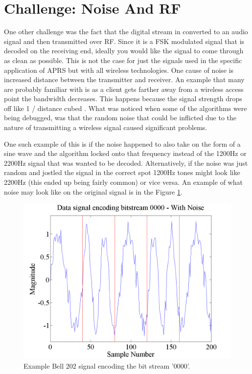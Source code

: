 \section{Challenge: Noise And RF}
One other challenge was the fact that the digital stream in converted to an audio signal and then transmitted over RF. Since it is a FSK modulated signal that is decoded on the receiving end, ideally you would like the signal to come through as clean as possible. This is not the case for just the signals used in the specific application of APRS but with all wireless technologies. One cause of noise is increased distance between the transmitter and receiver. An example that many are probably familiar with is as a client gets farther away from a wireless access point the bandwidth decreases. This happens because the signal strength drops off like 1 / distance cubed \cite{4Gon}. What was noticed when some of the algorithms were being debugged, was that the random noise that could be inflicted due to the nature of transmitting a wireless signal caused significant problems.

One such example of this is if the noise happened to also take on the form of a sine wave and the algorithm locked onto that frequency instead of the 1200Hz or 2200Hz signal that was wanted to be decoded. Alternatively, if the noise was just random and jostled the signal in the correct spot 1200Hz tones might look like 2200Hz (this ended up being fairly common) or vice versa. An example of what noise may look like on the original signal is in the Figure \ref{noiseExample}.
\begin{figure}
  \centering
	\includegraphics[width=0.75\linewidth]{images/Datasignalencodingbitstream0000WithNoise.png} 
	\caption{Example Bell 202 signal encoding the bit stream '0000'.}
   \label{noiseExample}
\end{figure}

